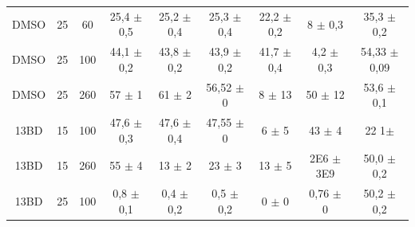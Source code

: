 \begin{table}[h]
\begin{adjustbox}{angle=90}
{\begin{tabular}{c c c | c c c c c c}
		DMSO    & 25         & 60         & 25,4    \(\pm\) 0,5 & 25,2     \(\pm\) 0,4 & 25,3     \(\pm\) 0,4 & 22,2        \(\pm\) 0,2 & 8           \(\pm\) 0,3 & 35,3  \(\pm\)  0,2 \\
		DMSO    & 25         & 100        & 44,1    \(\pm\) 0,2 & 43,8     \(\pm\) 0,2 & 43,9     \(\pm\) 0,2 & 41,7        \(\pm\) 0,4 & 4,2         \(\pm\) 0,3 & 54,33 \(\pm\)  0,09 \\
		DMSO    & 25         & 260        & 57      \(\pm\) 1   & 61       \(\pm\) 2   & 56,52    \(\pm\) 0   & 8           \(\pm\) 13  & 50          \(\pm\) 12  & 53,6  \(\pm\)  0,1 \\ 
		13BD    & 15         & 100        & 47,6    \(\pm\) 0,3 & 47,6     \(\pm\) 0,4 & 47,55    \(\pm\) 0   & 6           \(\pm\) 5   & 43          \(\pm\) 4   & 22  1\(\pm\) \\
		13BD    & 15         & 260        & 55      \(\pm\) 4   & 13       \(\pm\) 2   & 23       \(\pm\) 3   & 13          \(\pm\) 5   & 2E6       \(\pm\) 3E9   & 50,0  \(\pm\)  0,2 \\
		13BD    & 25         & 100        & 0,8     \(\pm\) 0,1 & 0,4      \(\pm\) 0,2 & 0,5      \(\pm\) 0,2 & 0           \(\pm\) 0   & 0,76        \(\pm\) 0   & 50,2  \(\pm\)  0,2 \\ \bottomrule
		\end{tabular}
	}{} \end{adjustbox}
\end{table} 

